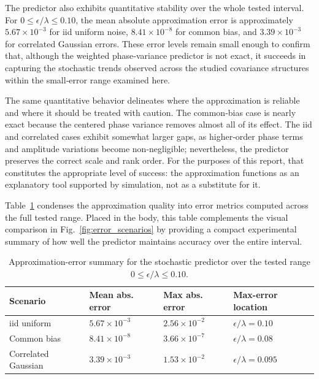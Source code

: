 The predictor also exhibits quantitative stability over the whole tested interval. For \(0 \le \epsilon/\lambda \le 0.10\), the mean absolute approximation error is approximately \(5.67 \times 10^{-3}\) for iid uniform noise, \(8.41 \times 10^{-8}\) for common bias, and \(3.39 \times 10^{-3}\) for correlated Gaussian errors. These error levels remain small enough to confirm that, although the weighted phase‑variance predictor is not exact, it succeeds in capturing the stochastic trends observed across the studied covariance structures within the small‑error range examined here.

The same quantitative behavior delineates where the approximation is reliable and where it should be treated with caution. The common‑bias case is nearly exact because the centered phase variance removes almost all of its effect. The iid and correlated cases exhibit somewhat larger gaps, as higher‑order phase terms and amplitude variations become non‑negligible; nevertheless, the predictor preserves the correct scale and rank order. For the purposes of this report, that constitutes the appropriate level of success: the approximation functions as an explanatory tool supported by simulation, not as a substitute for it.

Table~\ref{tab:stochastic_error_summary} condenses the approximation quality into error metrics computed across the full tested range. Placed in the body, this table complements the visual comparison in Fig.~\ref{fig:error_scenarios} by providing a compact experimental summary of how well the predictor maintains accuracy over the entire interval.


\begin{table}[H]
\centering
\small
\caption{Approximation-error summary for the stochastic predictor over the tested range $0 \le \epsilon/\lambda \le 0.10$.}
\label{tab:stochastic_error_summary}
\begin{tabularx}{\textwidth}{>{\raggedright\arraybackslash}p{} >{\centering\arraybackslash}X >{\centering\arraybackslash}X >{\centering\arraybackslash}X}
\toprule
Scenario & Mean abs. error & Max abs. error & Max-error location \\
\midrule
iid uniform & $5.67 \times 10^{-3}$ & $2.56 \times 10^{-2}$ & $\epsilon/\lambda = 0.10$ \\
Common bias & $8.41 \times 10^{-8}$ & $3.66 \times 10^{-7}$ & $\epsilon/\lambda = 0.08$ \\
Correlated Gaussian & $3.39 \times 10^{-3}$ & $1.53 \times 10^{-2}$ & $\epsilon/\lambda = 0.095$ \\
\bottomrule
\end{tabularx}
\end{table}

